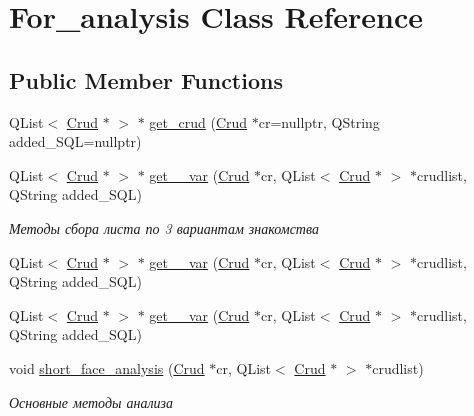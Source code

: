 \hypertarget{class_for__analysis}{}\section{For\+\_\+analysis Class Reference}
\label{class_for__analysis}
\subsection*{Public Member Functions}
\begin{DoxyCompactItemize}
\item 
Q\+List$<$ \mbox{\hyperlink{class_crud}{Crud}} $\ast$ $>$ $\ast$ \mbox{\hyperlink{class_for__analysis_a80f0d4137f297ab56b6251c64e089a6e}{get\+\_\+crud}} (\mbox{\hyperlink{class_crud}{Crud}} $\ast$cr=nullptr, Q\+String added\+\_\+\+S\+QL=nullptr)
\item 
Q\+List$<$ \mbox{\hyperlink{class_crud}{Crud}} $\ast$ $>$ $\ast$ \mbox{\hyperlink{class_for__analysis_a6cad406961034ae0ea3d87f42eef3ddd}{get\+\_\+\_\+var}} (\mbox{\hyperlink{class_crud}{Crud}} $\ast$cr, Q\+List$<$ \mbox{\hyperlink{class_crud}{Crud}} $\ast$ $>$ $\ast$crudlist, Q\+String added\+\_\+\+S\+QL)
\begin{DoxyCompactList}\small\item\em Методы сбора листа по 3 вариантам знакомства \end{DoxyCompactList}\item 
Q\+List$<$ \mbox{\hyperlink{class_crud}{Crud}} $\ast$ $>$ $\ast$ \mbox{\hyperlink{class_for__analysis_a43408fde4bae007cd9cb223518a3f2f1}{get\+\_\+\_\+var}} (\mbox{\hyperlink{class_crud}{Crud}} $\ast$cr, Q\+List$<$ \mbox{\hyperlink{class_crud}{Crud}} $\ast$ $>$ $\ast$crudlist, Q\+String added\+\_\+\+S\+QL)
\item 
Q\+List$<$ \mbox{\hyperlink{class_crud}{Crud}} $\ast$ $>$ $\ast$ \mbox{\hyperlink{class_for__analysis_acf3fa003dff0a49b33fcd628b5fc0e98}{get\+\_\+\_\+var}} (\mbox{\hyperlink{class_crud}{Crud}} $\ast$cr, Q\+List$<$ \mbox{\hyperlink{class_crud}{Crud}} $\ast$ $>$ $\ast$crudlist, Q\+String added\+\_\+\+S\+QL)
\item 
\mbox{\label{class_for__analysis_a85f19436c999c892dac1212bee8c132b}} 
void \mbox{\hyperlink{class_for__analysis_a85f19436c999c892dac1212bee8c132b}{short\+\_\+face\+\_\+analysis}} (\mbox{\hyperlink{class_crud}{Crud}} $\ast$cr, Q\+List$<$ \mbox{\hyperlink{class_crud}{Crud}} $\ast$ $>$ $\ast$crudlist)
\begin{DoxyCompactList}\small\item\em Основные методы анализа \end{DoxyCompactList}\item 

\end{DoxyCompactItemize}
